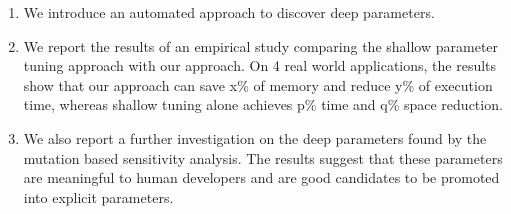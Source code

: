 \begin{enumerate}

\item We introduce an automated approach to discover deep parameters. 

\item We report the results of an empirical study comparing the shallow parameter tuning approach with our approach. On 4 real world applications, the results show that our approach can save x\% of memory and reduce y\% of execution time, whereas shallow tuning alone achieves p\% time and q\% space reduction. 

\item We also report a further investigation on the deep parameters found by the mutation based sensitivity analysis. The results suggest that these parameters are meaningful to human developers and are good candidates to be promoted into explicit parameters. 

\end{enumerate}



